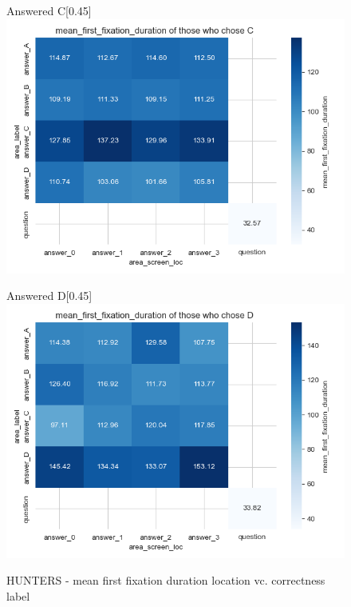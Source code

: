 \documentclass{article}
\begin{document}
\begin{figure}[H]
  \vspace{1em} %

  \begin{subcaptionbox}{Answered C\label{fig:C_ff_h}}[0.45\textwidth]
    {\centering\includegraphics[width=\linewidth]{plots/matrix_plots/matrix_mean_first_fixation_duration_C_hunters.png}}
  \end{subcaptionbox}
  \hfill
  \begin{subcaptionbox}{Answered D\label{fig:D_ff_h}}[0.45\textwidth]
    {\centering\includegraphics[width=\linewidth]{plots/matrix_plots/matrix_mean_first_fixation_duration_D_hunters.png}}
  \end{subcaptionbox}
  
  \caption{HUNTERS - mean first fixation duration location vc. correctness label}
  \label{fig:fourimages5}
\end{figure}
\end{document}
